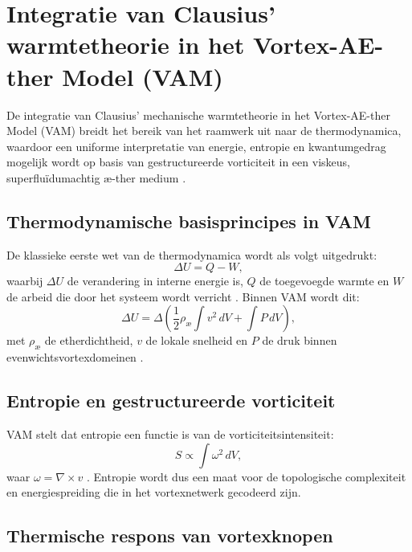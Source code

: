\section{Integratie van Clausius' warmtetheorie in het Vortex-AE-ther Model (VAM)}

De integratie van Clausius' mechanische warmtetheorie in het Vortex-AE-ther Model (VAM) breidt het bereik van het raamwerk uit naar de thermodynamica,
waardoor een uniforme interpretatie van energie, entropie en kwantumgedrag mogelijk wordt op basis van gestructureerde vorticiteit in een viskeus, superfluïdumachtig \ae-ther
medium \cite{clausius1865mechanisch, maxwell1865elektromagnetisch, helmholtz1858integralen}.

\subsection{Thermodynamische basisprincipes in VAM}

De klassieke eerste wet van de thermodynamica wordt als volgt uitgedrukt:
\begin{equation}
\Delta U = Q - W,\label{eq:first_law_thermodynamics}
\end{equation}
waarbij $\Delta U$ de verandering in interne energie is, $Q$ de toegevoegde warmte en $W$ de arbeid die door het systeem wordt verricht \cite{clausius1865mechanical}. Binnen VAM wordt dit:
\begin{equation}
\Delta U = \Delta \left( \frac{1}{2} \rho_{\text{\ae}} \int v^2 \, dV + \int P \, dV \right),\label{eq:first_law_vam}
\end{equation}
met $\rho_{\text{\ae}}$ de etherdichtheid, $v$ de lokale snelheid en $P$ de druk binnen evenwichtsvortexdomeinen \cite{vam2025unified}.

\subsection{Entropie en gestructureerde vorticiteit}

VAM stelt dat entropie een functie is van de vorticiteitsintensiteit:
\begin{equation}
S \propto \int \omega^2 \, dV,\label{eq:entropy_vorticity}
\end{equation}
waar $\omega = \nabla \times v$ \cite{kelvin1867vortex}. Entropie wordt dus een maat voor de topologische complexiteit en energiespreiding die in het vortexnetwerk gecodeerd zijn.

\subsection{Thermische respons van vortexknopen}

